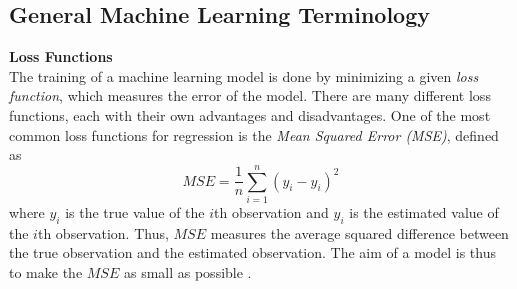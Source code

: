 \documentclass[./main.tex]{subfiles}
\begin{document}
\subsection{General Machine Learning Terminology}
\noindent \textbf{Loss Functions} \\
The training of a machine learning model is done by minimizing a given \textit{loss function}, which measures the error of the model. There are many different loss functions, each with their own advantages and disadvantages. One of the most common loss functions for regression is the \textit{Mean Squared Error (MSE)}, defined as
$$MSE = \frac{1}{n} \sum_{i = 1} ^n \left( y_i - \hat{y}_i \right)^2$$
where $y_i$ is the true value of the $i$th observation and $\hat{y}_i$ is the estimated value of the $i$th observation. Thus, $MSE$ measures the average squared difference between the true observation and the estimated observation. The aim of a model is thus to make the $MSE$ as small as possible \cite{ISL}.
\end{document}
